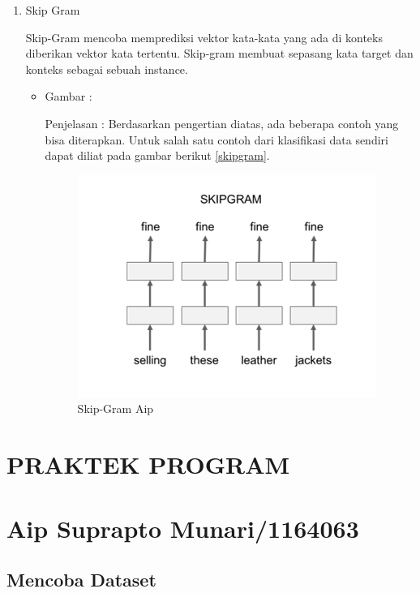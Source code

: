 \begin{enumerate}
\item Skip Gram
\par Skip-Gram mencoba memprediksi vektor kata-kata yang ada di konteks diberikan vektor kata tertentu. Skip-gram membuat sepasang kata target dan konteks sebagai sebuah instance.
\par
\begin{itemize}
\item Gambar :
\par Penjelasan : Berdasarkan pengertian diatas, ada beberapa contoh yang bisa diterapkan. Untuk salah satu contoh dari klasifikasi data sendiri dapat diliat pada gambar berikut \ref{skipgram}.
\begin{figure}[!hbtp]
\centering
\includegraphics[scale=0.2]{figures/AIP/d6.PNG}
\caption{Skip-Gram Aip}
\label{text-Aip}
\end{figure}
\end{itemize}
\end{enumerate}


\section{PRAKTEK PROGRAM}
\section{Aip Suprapto Munari/1164063}
\subsection{Mencoba Dataset}
